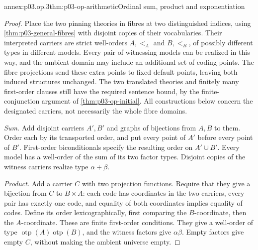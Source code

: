 \begin{annexitem}{annex:p03.op.3}{thm:p03-op-arithmetic}{Ordinal sum, product and exponentiation}
\begin{proof}
Place the two pinning theories in fibres at two distinguished indices,
using \cref{thm:p03-general-fibres} with disjoint copies of their
vocabularies. Their interpreted carriers are strict well-orders
\(A,<_{A}\) and \(B,<_{B}\), of possibly different types in
different models. Every pair of witnessing models can be realized
in this way, and the ambient domain may include an additional
set of coding points. The fibre projections send these extra
points to fixed default points, leaving both induced structures
unchanged. The two translated theories and finitely many
first-order clauses still have the required sentence bound,
by the finite-conjunction argument of \cref{thm:p03-op-initial}.
All constructions below concern the designated carriers, not
necessarily the whole fibre domains.

\emph{Sum.} Add disjoint carriers \(A',B'\) and graphs of
bijections from \(A,B\) to them. Order each by its transported
order, and put every point of \(A'\) before every point of
\(B'\). First-order biconditionals specify the resulting order
on \(A'\cup B'\). Every model has a well-order of the sum of
its two factor types. Disjoint copies of the witness carriers
realize type \(\alpha+\beta\).

\emph{Product.} Add a carrier \(C\) with two projection
functions. Require that they give a bijection from \(C\) to
\(B\times A\): each code has coordinates in the two carriers,
every pair has exactly one code, and equality of both coordinates
implies equality of codes. Define its order lexicographically,
first comparing the \(B\)-coordinate, then the \(A\)-coordinate.
These are finite first-order conditions. They give a well-order
of type \(\operatorname{otp}(A)\operatorname{otp}(B)\),
and the witness factors give \(\alpha\beta\). Empty factors
give empty \(C\), without making the ambient universe empty.


\end{proof}
\end{annexitem}
